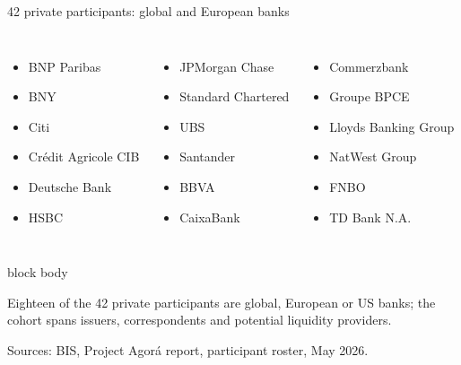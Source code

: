 \documentclass[aspectratio=169,12pt]{beamer}
\newcommand{\source}[1]{\vfill\par\fontsize{5.4}{6.5}\selectfont\color{Quiet}Sources: #1}
\newcommand{\verytightitems}{\setlength{\itemsep}{0.22em}\setlength{\parskip}{0pt}}
\newenvironment{statement}{%
  \begin{beamercolorbox}[sep=.18cm,rounded=false,wd=\linewidth]{block body}%
  \fontsize{13}{15.5}\selectfont\bfseries
}{\end{beamercolorbox}}
\begin{document}
\begin{frame}{42 private participants: global and European banks}
  \fontsize{9.7}{11.5}\selectfont
  \begin{columns}[T,onlytextwidth]
      \begin{itemize}\verytightitems
        \item BNP Paribas
        \item BNY
        \item Citi
        \item Cr\'edit Agricole CIB
        \item Deutsche Bank
        \item HSBC
      \end{itemize}
      \begin{itemize}\verytightitems
        \item JPMorgan Chase
        \item Standard Chartered
        \item UBS
        \item Santander
        \item BBVA
        \item CaixaBank
      \end{itemize}
      \begin{itemize}\verytightitems
        \item Commerzbank
        \item Groupe BPCE
        \item Lloyds Banking Group
        \item NatWest Group
        \item FNBO
        \item TD Bank N.A.
      \end{itemize}
  \end{columns}
  \begin{statement}
    Eighteen of the 42 private participants are global, European or US banks; the cohort spans issuers, correspondents and potential liquidity providers.
  \end{statement}
  \source{BIS, Project Agor\'a report, participant roster, May 2026.}
\end{frame}
\end{document}

